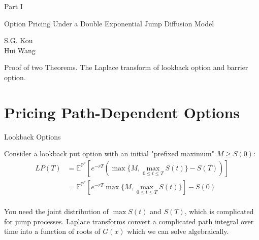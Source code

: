 \documentclass{beamer}
\begin{document}
\begin{frame}{Part I}
    \begin{center}
        Option Pricing Under a Double Exponential Jump Diffusion Model
    \end{center}
    \vspace{2em}
    \begin{center}
        S.G. Kou\\
        Hui Wang
    \end{center}
    \vspace{3em}
    \par Proof of two Theorems. The Laplace transform of lookback option and barrier option.
 \end{frame}
\section{Pricing Path-Dependent Options}
\begin{frame}{Lookback Options}

    {\footnotesize \footnotesize
    \par Consider a lookback put option with an initial "prefixed maximum" \( M \geq S(0) \):
    \vspace{1em}
    \begin{align*}
        LP(T) &= \mathbb{E}^{\mathbb{P}^*} \left[ e^{-rT} \left( \max\{M, \max_{0 \leq t \leq T} S(t)\} - S(T) \right) \right]\\
        & =   \mathbb{E}^{\mathbb{P}^*}\left[ e^{-rT} \max\{M, \max_{0 \leq t \leq T} S(t)\} \right] - S(0)\\
    \end{align*}

    \par \pause  You need the joint distribution of $\max S(t)$ and $S(T)$, which is complicated for jump processes. 
    Laplace transforms convert a complicated path integral over time into a function of roots of $G(x)$
    which we can solve algebraically.
    }
    
\end{frame}
\end{document}
